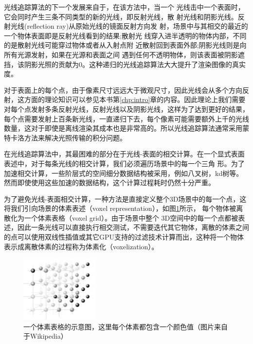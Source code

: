 光线追踪算法的下一个发展来自于\cite{a:Animprovedilluminationmodelforshadeddisplay}，在该方法中，当一个 光线击中一个表面时，它会同时产生三条不同类型的新的光线，即反射光线，散 射光线和阴影光线。反射光线(reflection ray)从原始光线的镜面反射方向发 射，场景中与其相交的最近的一个物体表面即是反射光线看到的结果;散射光 线穿入进半透明的物体内部，不同的是散射光线可能穿过物体或者从入射点附 近散射回到表面外部;阴影光线则是向所有光源发射，如果在光源和表面之间 遇到任何不透明物体，则该表面被阴影遮挡，该阴影光照的贡献为0。这种递归的光线追踪算法大大提升了渲染图像的真实度。

对于表面上的每个点，由于像素尺寸远远大于微观尺寸，因此光线会从多个方向反射，这方面的理论知识可以参见本书第\ref{chp:intro}章的内容。因此理论上我们需要对每个点发射多条反射光线，反射光线以及阴影光线，这样为了达到更好的结果，每个点需要发射上百条新光线，一直递归下去，每个像素可能需要额外上千的光线数量，这对于即使是离线渲染其成本也是非常高的。所以光线追踪算法通常采用蒙特卡洛方法来解决光照传输的积分问题。

在光线追踪算法中，其最困难的部分在于光线-表面的相交计算。在一个显式表面表述中，对于每条光线的相交计算，我们必须遍历场景中的每一个三角 形。为了加速相交计算，一些阶层式的空间细分数据结构被采用，例如八叉树，kd树等。然而即使使用这些加速的数据结构，这个计算过程耗时仍然十分严重。

为了避免光线-表面相交计算，一种方法是直接定义整个3D场景中的每一个点，这将我们引向场景的体素表述（voxel representation），如图\ref{f:df-Voxelgitter}所示， 每个物体被离散化为一个体素表格（voxel grid）。由于场景中整个 3D空间中的每一个点都被表述，因此一条光线可以直接执行相交测试，不需要迭代其它物体，离散的体素之间的点可以使用双线性插值或其它GPU支持的过滤技术计算而出，这种将一个物体表示成离散体素的过程称为体素化（voxelization）。

\begin{figure}
	\sidecaption
	\includegraphics[width=0.35\textwidth]{figures/df/Voxelgitter}
	\caption{一个体素表格的示意图，这里每个体素都包含一个颜色值（图片来自于Wikipedia）}
	\label{f:df-Voxelgitter}
\end{figure}

